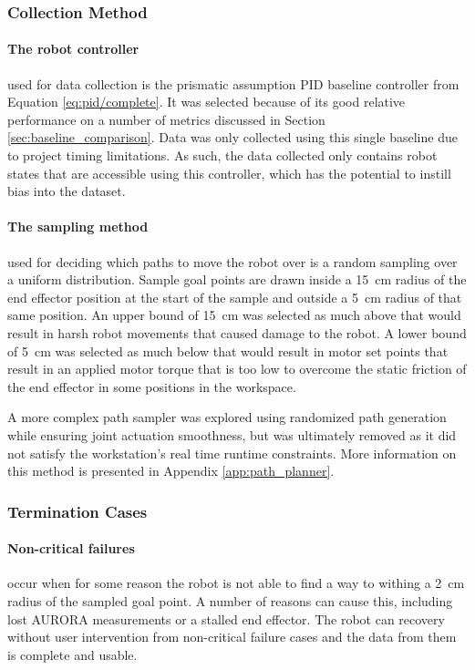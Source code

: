 \subsubsection{Collection Method}
\paragraph{The robot controller} used for data collection is the prismatic assumption PID baseline controller from Equation \eqref{eq:pid/complete}. It was selected because of its good relative performance on a number of metrics discussed in Section \ref{sec:baseline_comparison}. Data was only collected using this single baseline due to project timing limitations. As such, the data collected only contains robot states that are accessible using this controller, which has the potential to instill bias into the dataset. 

\paragraph{The sampling method} used for deciding which paths to move the robot over is a random sampling over a uniform distribution. Sample goal points are drawn inside a \SI{15}{cm} radius of the end effector position at the start of the sample and outside a \SI{5}{cm} radius of that same position. An upper bound of \SI{15}{cm} was selected as much above that would result in harsh robot movements that caused damage to the robot. A lower bound of \SI{5}{cm} was selected as much below that would result in motor set points that result in an applied motor torque that is too low to overcome the static friction of the end effector in some positions in the workspace. 

A more complex path sampler was explored using randomized path generation while ensuring joint actuation smoothness, but was ultimately removed as it did not satisfy the workstation's real time runtime constraints. More information on this method is presented in Appendix \ref{app:path_planner}. 


\subsubsection{Termination Cases}
\paragraph{Non-critical failures} occur when for some reason the robot is not able to find a way to withing a \SI{2}{cm} radius of the sampled goal point. A number of reasons can cause this, including lost AURORA measurements or a stalled end effector. The robot can recovery without user intervention from non-critical failure cases and the data from them is complete and usable. 

